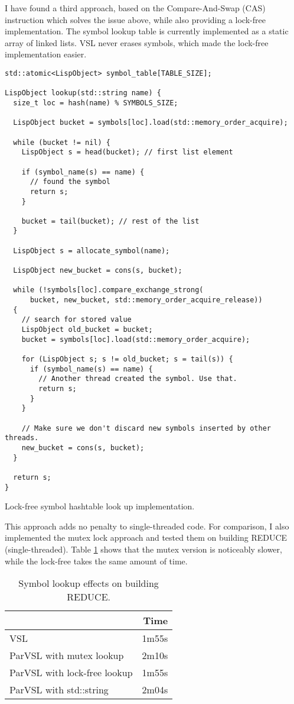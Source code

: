 I have found a third approach, based on the Compare-And-Swap (CAS) instruction which solves the issue
above, while also providing a lock-free implementation. The symbol lookup table is currently implemented
as a static array of linked lists. VSL never erases symbols, which made the lock-free implementation easier.

\begin{code}
\begin{verbatim}
std::atomic<LispObject> symbol_table[TABLE_SIZE];

LispObject lookup(std::string name) {
  size_t loc = hash(name) % SYMBOLS_SIZE;

  LispObject bucket = symbols[loc].load(std::memory_order_acquire);

  while (bucket != nil) {
    LispObject s = head(bucket); // first list element

    if (symbol_name(s) == name) {
      // found the symbol
      return s;
    }

    bucket = tail(bucket); // rest of the list
  }

  LispObject s = allocate_symbol(name);

  LispObject new_bucket = cons(s, bucket);

  while (!symbols[loc].compare_exchange_strong(
      bucket, new_bucket, std::memory_order_acquire_release))
  {
    // search for stored value
    LispObject old_bucket = bucket;
    bucket = symbols[loc].load(std::memory_order_acquire);

    for (LispObject s; s != old_bucket; s = tail(s)) {
      if (symbol_name(s) == name) {
        // Another thread created the symbol. Use that.
        return s;
      }
    }

    // Make sure we don't discard new symbols inserted by other threads.
    new_bucket = cons(s, bucket);
  }

  return s;
}
\end{verbatim}
\caption{Lock-free symbol hashtable look up implementation.}
\label{code:lockfree}
\end{code}

This approach adds no penalty to single-threaded
code. For comparison, I also implemented the mutex lock approach and tested
them on building REDUCE (single-threaded). Table \ref{tab:lockfree} shows that the mutex
version is noticeably slower, while the lock-free takes the same amount of time.

\begin{table}[H]
  \centering
  \begin{tabular}{lr}
                               & Time \\
  \hline
  VSL                          & 1m55s \\
  ParVSL with mutex lookup     & 2m10s \\
  ParVSL with lock-free lookup & 1m55s \\
  ParVSL with std::string      & 2m04s
  \end{tabular}
  \caption{Symbol lookup effects on building REDUCE.}
  \label{tab:lockfree}
\end{table}

